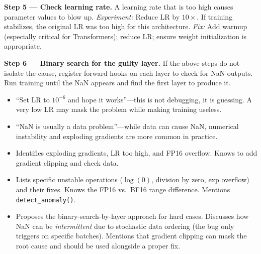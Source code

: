 \begin{interviewq}
\textbf{Step 5 --- Check learning rate.} A learning rate that is too high causes parameter values to blow up. \textit{Experiment:} Reduce LR by $10\times$. If training stabilizes, the original LR was too high for this architecture. \textit{Fix:} Add warmup (especially critical for Transformers); reduce LR; ensure weight initialization is appropriate.

\textbf{Step 6 --- Binary search for the guilty layer.} If the above steps do not isolate the cause, register forward hooks on each layer to check for NaN outputs. Run training until the NaN appears and find the first layer to produce it.

\redflags
\begin{itemize}
    \item ``Set LR to $10^{-6}$ and hope it works''---this is not debugging, it is guessing. A very low LR may mask the problem while making training useless.
    \item ``NaN is usually a data problem''---while data can cause NaN, numerical instability and exploding gradients are more common in practice.
\end{itemize}


\goodgreat
\begin{itemize}
    \item {} Identifies exploding gradients, LR too high, and FP16 overflow. Knows to add gradient clipping and check data.
    \item {} Lists specific unstable operations ($\log(0)$, division by zero, exp overflow) and their fixes. Knows the FP16 vs.\ BF16 range difference. Mentions \texttt{detect\_anomaly()}.
    \item {} Proposes the binary-search-by-layer approach for hard cases. Discusses how NaN can be \textit{intermittent} due to stochastic data ordering (the bug only triggers on specific batches). Mentions that gradient clipping can mask the root cause and should be used alongside a proper fix.
\end{itemize}

\end{interviewq}

